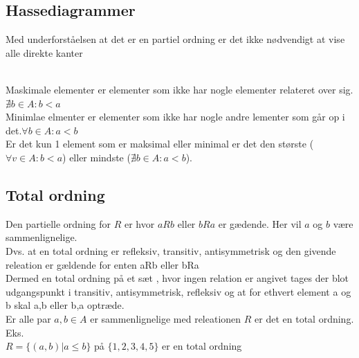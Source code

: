 \documentclass[12pt, a4paper]{article}
\begin{document}
				\subsection{Hassediagrammer}
				Med underforståelsen at det er en partiel ordning er det ikke nødvendigt at vise alle direkte kanter\\
				\\
					Maskimale elementer er elementer som ikke har nogle elementer relateret over sig. $\nexists b\in A: b<a$\\
					Minimlae elmenter er elementer som ikke har nogle andre lementer som går op i det.$\forall b \in A: a<b$\\
					Er det kun 1 element som er maksimal eller minimal er det den største ($\forall v \in A: b<a$) eller mindste ($\nexists b \in A: a<b$).\\
					
				\subsection{Total ordning}
					Den partielle ordning for $R$ er hvor $a R b$ eller $b R a$ er gædende. Her vil $a$ og $b$ være sammenlignelige.\\
					Dvs. at en total ordning er refleksiv, transitiv, antisymmetrisk og den givende releation er gældende for enten aRb eller bRa\\
					Dermed en total ordning på et sæt , hvor ingen relation er angivet tages der blot udgangspunkt i transitiv, antisymmetrisk, refleksiv og at for ethvert element a og b skal a,b eller b,a optræde.\\
					Er alle  par $a,b \in A$ er sammenlignelige med releationen $R$ er det en total ordning.
					Eks. \\
					$R=\{(a,b)|a\leq b\}$ på $\{1,2,3,4,5\}$ er en total ordning\\
\end{document}
